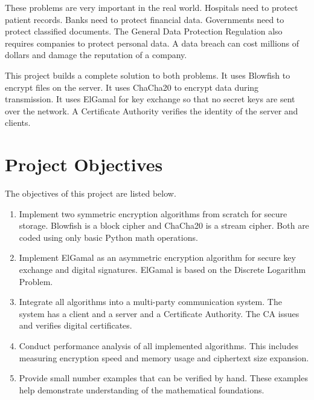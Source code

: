 \documentclass[12pt,a4paper]{article}
\begin{document}
These problems are very important in the real world. Hospitals need to protect patient records. Banks need to protect financial data. Governments need to protect classified documents. The General Data Protection Regulation also requires companies to protect personal data. A data breach can cost millions of dollars and damage the reputation of a company.

This project builds a complete solution to both problems. It uses Blowfish to encrypt files on the server. It uses ChaCha20 to encrypt data during transmission. It uses ElGamal for key exchange so that no secret keys are sent over the network. A Certificate Authority verifies the identity of the server and clients.


\section{Project Objectives}

The objectives of this project are listed below.

\begin{enumerate}
    \item Implement two symmetric encryption algorithms from scratch for secure storage. Blowfish is a block cipher and ChaCha20 is a stream cipher. Both are coded using only basic Python math operations.
    \item Implement ElGamal as an asymmetric encryption algorithm for secure key exchange and digital signatures. ElGamal is based on the Discrete Logarithm Problem.
    \item Integrate all algorithms into a multi-party communication system. The system has a client and a server and a Certificate Authority. The CA issues and verifies digital certificates.
    \item Conduct performance analysis of all implemented algorithms. This includes measuring encryption speed and memory usage and ciphertext size expansion.
    \item Provide small number examples that can be verified by hand. These examples help demonstrate understanding of the mathematical foundations.
\end{enumerate}

\end{document}
